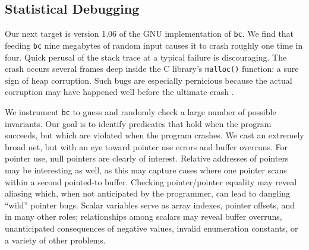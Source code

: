 \subsection{Statistical Debugging}
\label{sec:bc}


Our next target is version 1.06 of the GNU implementation of
\texttt{bc}.  We find that feeding \texttt{bc} nine megabytes of
random input causes it to crash roughly one time in four.
Quick perusal of the stack trace at a typical failure is discouraging.
The crash occurs several frames deep inside the C library's
\texttt{malloc()} function: a sure sign of heap corruption.  Such bugs
are especially pernicious because the actual corruption may have
happened well before the ultimate crash \cite{Eisenstadt1993b}.

We instrument \texttt{bc} to guess and randomly check a large number
of possible invariants.  Our goal is to identify predicates that hold
when the program succeeds, but which are violated when the program
crashes.  We cast an extremely broad net, but with an eye toward
pointer use errors and buffer overruns.  For pointer use, null
pointers are clearly of interest.  Relative addresses of pointers may
be interesting as well, as this may capture cases where one pointer
scans within a second pointed-to buffer.  Checking pointer/pointer
equality may reveal aliasing which, when not anticipated by the
programmer, can lead to dangling ``wild'' pointer bugs.  Scalar
variables serve as array indexes, pointer offsets, and in many other
roles; relationships among scalars may reveal buffer overruns,
unanticipated consequences of negative values, invalid enumeration
constants, or a variety of other problems.

